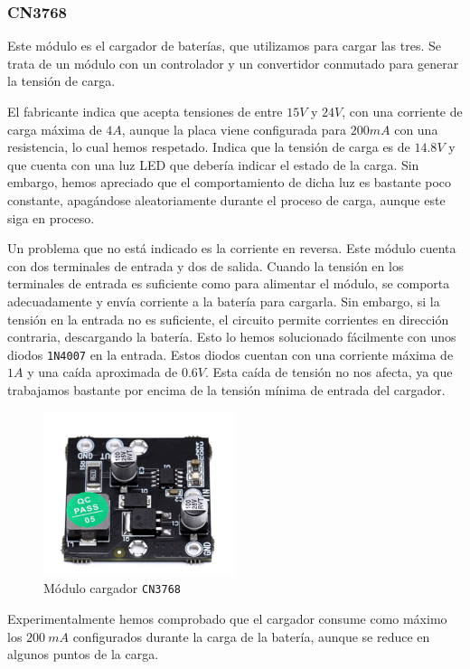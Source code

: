 \subsubsection{CN3768}

Este módulo es el cargador de baterías, que utilizamos para cargar las tres. Se trata de un módulo con un controlador y un convertidor conmutado para generar la tensión de carga. 

El fabricante indica que acepta tensiones de entre $15 V$ y $24 V$, con una corriente de carga máxima de $4 A$, aunque la placa viene configurada para $200 mA$ con una resistencia, lo cual hemos respetado. Indica que la tensión de carga es de $14.8 V$ y que cuenta con una luz LED que debería indicar el estado de la carga. Sin embargo, hemos apreciado que el comportamiento de dicha luz es bastante poco constante, apagándose aleatoriamente durante el proceso de carga, aunque este siga en proceso. \cite{consonanceCN3768}

Un problema que no está indicado es la corriente en reversa. Este módulo cuenta con dos terminales de entrada y dos de salida. Cuando la tensión en los terminales de entrada es suficiente como para alimentar el módulo, se comporta adecuadamente y envía corriente a la batería para cargarla. Sin embargo, si la tensión en la entrada no es suficiente, el circuito permite corrientes en dirección contraria, descargando la batería. Esto lo hemos solucionado fácilmente con unos diodos \texttt{1N4007} en la entrada. Estos diodos cuentan con una corriente máxima de $1 A$ y una caída aproximada de $0.6 V$. Esta caída de tensión no nos afecta, ya que trabajamos bastante por encima de la tensión mínima de entrada del cargador.

\begin{figure}[H]
    \centering
    \includegraphics[width=0.5\textwidth]{images/2-hardware/componentes/CN3768.png}
    \caption{Módulo cargador \texttt{CN3768}}
    \label{fig:hardware/modulos/cn3768}
\end{figure}

Experimentalmente hemos comprobado que el cargador consume como máximo los $200\ mA$ configurados durante la carga de la batería, aunque se reduce en algunos puntos de la carga.